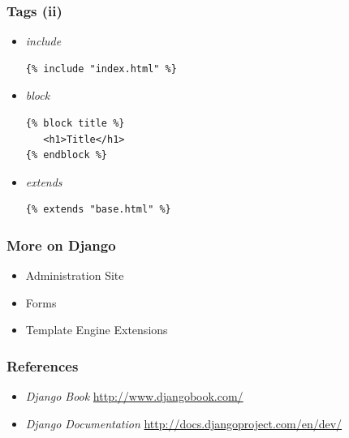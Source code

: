 \begin{frame}[fragile]
\frametitle{Tags (ii)}
\begin{itemize}
\item \textit{include}
{\scriptsize
\begin{verbatim}
{% include "index.html" %}
\end{verbatim}
}
\item \textit{block}
{\scriptsize
\begin{verbatim}
{% block title %}
   <h1>Title</h1>
{% endblock %}
\end{verbatim}
}
\item \textit{extends}
{\scriptsize
\begin{verbatim}
{% extends "base.html" %}
\end{verbatim}
}
\end{itemize}
\end{frame}



\begin{frame}
\frametitle{More on Django}
\begin{itemize}
\item Administration Site
\item Forms
\item Template Engine Extensions
\end{itemize}
\end{frame}



\begin{frame}
\frametitle{References}
\begin{itemize}
\item \textit{Django Book} \url{http://www.djangobook.com/}
\item \textit{Django Documentation} \url{http://docs.djangoproject.com/en/dev/}
\end{itemize}
\end{frame}

